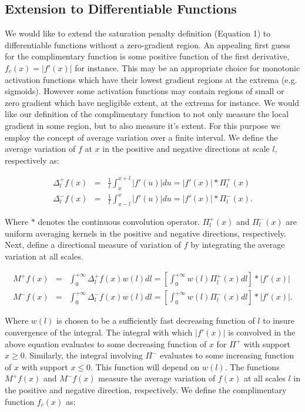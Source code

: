 \documentclass{article} %
\begin{document}
\subsection{Extension to Differentiable Functions}
We would like to extend the saturation penalty definition (Equation 1) to differentiable functions without a zero-gradient region. An appealing first guess for the complimentary function is some positive function of the first derivative, $f_c(x) = |f'(x)|$ for instance. This may be an appropriate choice for monotonic activation functions which have their lowest gradient regions at the extrema (e.g. sigmoids). However some activation functions may contain regions of small or zero gradient which have negligible extent, at the extrema for instance. We would like our definition of the complimentary function to not only measure the local gradient in some region, but to also measure it's extent. For this purpose we employ the concept of average variation over a finite interval. We define the average variation of $f$ at $x$ in the positive and negative directions at scale $l$, respectively as: 

\begin{eqnarray}
\nonumber
\Delta_l^+ f(x) &=& \frac{1}{l} \int_x ^{x+l} |f'(u)| du = |f'(x)| * \Pi_l^+(x)\\
\nonumber
\Delta_l^- f(x) &=& \frac{1}{l} \int_{x-l} ^x |f'(u)| du = |f'(x)| * \Pi_l^-(x).
\end{eqnarray} 

Where $*$ denotes the continuous convolution operator. $\Pi_l^+(x)$ and $\Pi_l^-(x)$ are uniform averaging kernels in the positive and negative directions, respectively. Next, define a directional measure of variation of $f$ by integrating the average variation at all scales. 

\begin{eqnarray}
\nonumber
M^+ f(x) &=& \int_0^{+\infty} \Delta_l^+ f(x) w(l)dl = \left[\int_0^{+\infty} w(l) \Pi^+_l(x) dl \right] * |f'(x)| \\
\nonumber
M^- f(x) &=& \int_0^{+\infty} \Delta_l^- f(x) w(l)dl = \left[\int_0^{+\infty} w(l) \Pi^-_l(x) dl \right] * |f'(x)| .
\end{eqnarray} 

Where $w(l)$ is chosen to be a sufficiently fast decreasing function of $l$ to insure convergence of the integral. The integral with which $|f'(x)|$ is convolved in the above equation evaluates to some decreasing function of $x$ for $\Pi^+$ with support $x \geq 0$. Similarly, the integral involving $\Pi^-$ evaluates to some increasing function of $x$ with support $x \leq 0$. This function will depend on $w(l)$. The functions $M^+f(x)$ and $M^-f(x)$ measure the average variation of $f(x)$ at all scales $l$ in the positive and negative direction, respectively. We define the complimentary function $f_c(x)$ as: 
\end{document}
